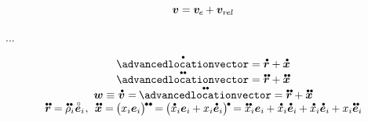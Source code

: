 \begin{otherlanguage}{russian}
\begin{equation}
\bm{v} = \bm{v}_{\hspace{-0.1ex}e} \hspace{-0.1ex} + \bm{v}_{r\kern-0.1exel}
\end{equation}

...

\begin{equation*}
\begin{array}{c}
\mathdotabove{\advancedlocationvector} = \mathdotabove{\locationvector} + \mathdotabove{\bm{x}}
\\
\mathdotdotabove{\advancedlocationvector} = \mathdotdotabove{\locationvector} + \mathdotdotabove{\bm{x}}
\\
\bm{w} \equiv \hspace{.1ex} \mathdotabove{\bm{v}} = \hspace{-0.15ex} \mathdotdotabove{\advancedlocationvector} = \mathdotdotabove{\locationvector} + \mathdotdotabove{\bm{x}}
\\
\mathdotdotabove{\locationvector} = \hspace{-0.1ex}
\mathdotdotabove{\rho}_i \hspace{.1ex} \mathcircabove{\bm{e}}_i
\hspace{.1ex} , \:\:
\mathdotdotabove{\bm{x}} = \hspace{-0.15ex} \bigl( x_i \bm{e}_i \bigr)^{ \hspace{-0.15ex} \tikz[baseline=-0.2ex] \draw[black, fill=black] (0,0) circle (.28ex); \hspace{.2ex} \tikz[baseline=-0.2ex] \draw[black, fill=black] (0,0) circle (.28ex); } \hspace{-0.2ex}
= \hspace{-0.15ex} \bigl( \mathdotabove{x}_i \bm{e}_i \hspace{-0.1ex} + x_i \mathdotabove{\bm{e}}_i \bigr)^{ \hspace{-0.15ex} \tikz[baseline=-0.2ex] \draw[black, fill=black] (0,0) circle (.28ex); } \hspace{-0.15ex}
= \mathdotdotabove{x}_i \bm{e}_i \hspace{-0.1ex} + \mathdotabove{x}_i \mathdotabove{\bm{e}}_i \hspace{-0.1ex}
+ \mathdotabove{x}_i \mathdotabove{\bm{e}}_i \hspace{-0.1ex} + x_i \mathdotdotabove{\bm{e}}_i \hspace{-0.1ex}
\end{array}
\end{equation*}


\end{otherlanguage}
